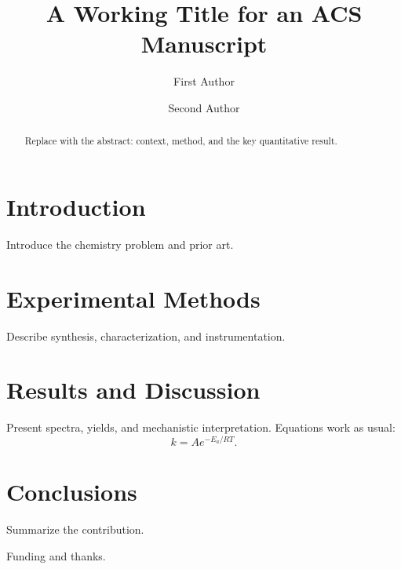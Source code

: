 \documentclass[journal=jacsat,manuscript=article]{achemso}
\author{First Author}
\affiliation{Department of Chemistry, Example University}
\author{Second Author}
\affiliation{Example National Laboratory}
\title{A Working Title for an ACS Manuscript}
\begin{document}
\begin{abstract}
Replace with the abstract: context, method, and the key quantitative result.
\end{abstract}

\section{Introduction}
Introduce the chemistry problem and prior art.

\section{Experimental Methods}
Describe synthesis, characterization, and instrumentation.

\section{Results and Discussion}
Present spectra, yields, and mechanistic interpretation. Equations work as
usual:
\begin{equation}
  k = A e^{-E_a / RT}.
\end{equation}

\section{Conclusions}
Summarize the contribution.

\begin{acknowledgement}
Funding and thanks.
\end{acknowledgement}
\end{document}
